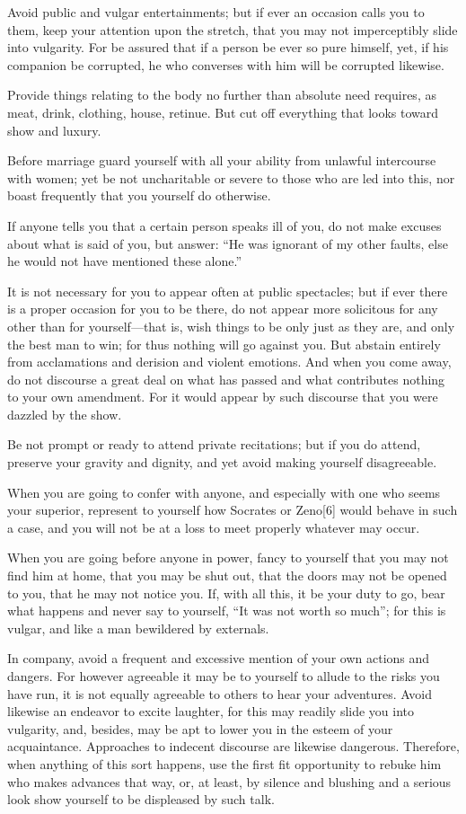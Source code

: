 \documentclass[a4paper]{article}
\begin{document}
Avoid public and vulgar entertainments; but if ever an occasion calls you
to them, keep your attention upon the stretch, that you may not
imperceptibly slide into vulgarity. For be assured that if a person be
ever so pure himself, yet, if his companion be corrupted, he who
converses with him will be corrupted likewise.

Provide things relating to the body no further than absolute need
requires, as meat, drink, clothing, house, retinue. But cut off
everything that looks toward show and luxury.

Before marriage guard yourself with all your ability from unlawful
intercourse with women; yet be not uncharitable or severe to those who
are led into this, nor boast frequently that you yourself do otherwise.

If anyone tells you that a certain person speaks ill of you, do not make
excuses about what is said of you, but answer: “He was ignorant of my
other faults, else he would not have mentioned these alone.”

It is not necessary for you to appear often at public spectacles; but if
ever there is a proper occasion for you to be there, do not appear more
solicitous for any other than for yourself—that is, wish things to be
only just as they are, and only the best man to win; for thus nothing
will go against you. But abstain entirely from acclamations and derision
and violent emotions. And when you come away, do not discourse a great
deal on what has passed and what contributes nothing to your own
amendment. For it would appear by such discourse that you were dazzled by
the show.

Be not prompt or ready to attend private recitations; but if you do
attend, preserve your gravity and dignity, and yet avoid making yourself
disagreeable.

When you are going to confer with anyone, and especially with one who
seems your superior, represent to yourself how Socrates or Zeno[6] would
behave in such a case, and you will not be at a loss to meet properly
whatever may occur.

When you are going before anyone in power, fancy to yourself that you may
not find him at home, that you may be shut out, that the doors may not be
opened to you, that he may not notice you. If, with all this, it be your
duty to go, bear what happens and never say to yourself, “It was not
worth so much”; for this is vulgar, and like a man bewildered by
externals.

In company, avoid a frequent and excessive mention of your own actions
and dangers. For however agreeable it may be to yourself to allude to the
risks you have run, it is not equally agreeable to others to hear your
adventures. Avoid likewise an endeavor to excite laughter, for this may
readily slide you into vulgarity, and, besides, may be apt to lower you
in the esteem of your acquaintance. Approaches to indecent discourse are
likewise dangerous. Therefore, when anything of this sort happens, use
the first fit opportunity to rebuke him who makes advances that way, or,
at least, by silence and blushing and a serious look show yourself to be
displeased by such talk.
\end{document}
